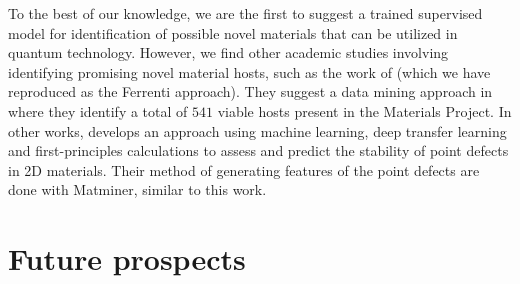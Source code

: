 To the best of our knowledge, we are the first to suggest a trained supervised model for identification of possible novel materials that can be utilized in quantum technology. However, we find other academic studies involving identifying promising novel material hosts, such as the work of \citeauthor{Ferrenti2020} \cite{Ferrenti2020} (which we have reproduced as the Ferrenti approach). They suggest a data mining approach in where they identify a total of $541$ viable hosts present in the Materials Project. In other works, \citeauthor{FreyNathanC2020MLDo} \cite{FreyNathanC2020MLDo} develops an approach using machine learning, deep transfer learning and first-principles calculations to assess and predict the stability of point defects in 2D materials. Their method of generating features of the point defects are done with Matminer, similar to this work.


\section*{Future prospects}

